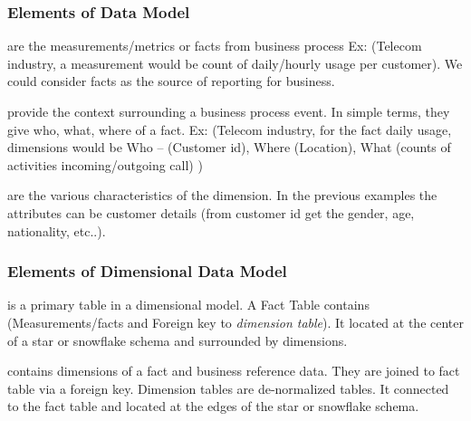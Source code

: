\begin{frame}
\frametitle{Elements of Data Model}
\begin{description}[<+->]
	\item[Facts] are the measurements/metrics or facts from business process Ex: (Telecom industry, a measurement would be count of daily/hourly usage per customer). We could consider facts as the source of reporting for business.
	\item[Dimensions] provide the context surrounding a business process event. In simple terms, they give who, what, where of a fact. Ex: (Telecom industry, for the fact daily usage, dimensions would be Who – (Customer id), Where (Location), What (counts of activities incoming/outgoing call) ) 

	\item[Attributes] are the various characteristics of the dimension.	In the previous examples the attributes can be customer details (from customer id get the gender, age, nationality, etc..).
\end{description}
\end{frame}


\begin{frame}
\frametitle{Elements of Dimensional Data Model}
	\begin{description}[<+->]
		\item[Fact Table] is a primary table in a dimensional model. A Fact Table contains (Measurements/facts and	Foreign key to \textit{dimension table}). It located at the center of a star or snowflake schema and surrounded by dimensions.	
		\item[Dimension table] contains dimensions of a fact and business reference data. They are joined to fact table via a foreign key. Dimension tables are de-normalized tables. It connected to the fact table and located at the edges of the star or snowflake schema.
			
	\end{description}
\end{frame}

